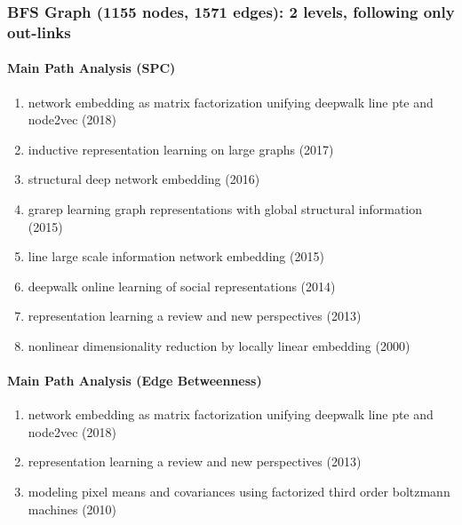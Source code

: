 \documentclass[lettepaper,]{article}
\providecommand{\tightlist}{%
  \setlength{\itemsep}{0pt}\setlength{\parskip}{0pt}}
\let\oldparagraph\paragraph
\renewcommand{\paragraph}[1]{\oldparagraph{#1}\mbox{}}
\begin{document}
\hypertarget{bfs-graph-1155-nodes-1571-edges-2-levels-following-only-out-links}{%
\subsubsection{BFS Graph (1155 nodes, 1571 edges): 2 levels, following
only
out-links}\label{bfs-graph-1155-nodes-1571-edges-2-levels-following-only-out-links}}

\hypertarget{main-path-analysis-spc-1}{%
\paragraph{Main Path Analysis (SPC)}\label{main-path-analysis-spc-1}}

\begin{enumerate}
\def\labelenumi{\arabic{enumi}.}
\tightlist
\item
  network embedding as matrix factorization unifying deepwalk line pte
  and node2vec (2018)
\item
  inductive representation learning on large graphs (2017)
\item
  structural deep network embedding (2016)
\item
  grarep learning graph representations with global structural
  information (2015)
\item
  line large scale information network embedding (2015)
\item
  deepwalk online learning of social representations (2014)
\item
  representation learning a review and new perspectives (2013)
\item
  nonlinear dimensionality reduction by locally linear embedding (2000)
\end{enumerate}

\hypertarget{main-path-analysis-edge-betweenness-1}{%
\paragraph{Main Path Analysis (Edge
Betweenness)}\label{main-path-analysis-edge-betweenness-1}}

\begin{enumerate}
\def\labelenumi{\arabic{enumi}.}
\tightlist
\item
  network embedding as matrix factorization unifying deepwalk line pte
  and node2vec (2018)
\item
  representation learning a review and new perspectives (2013)
\item
  modeling pixel means and covariances using factorized third order
  boltzmann machines (2010)
\end{enumerate}
\end{document}
